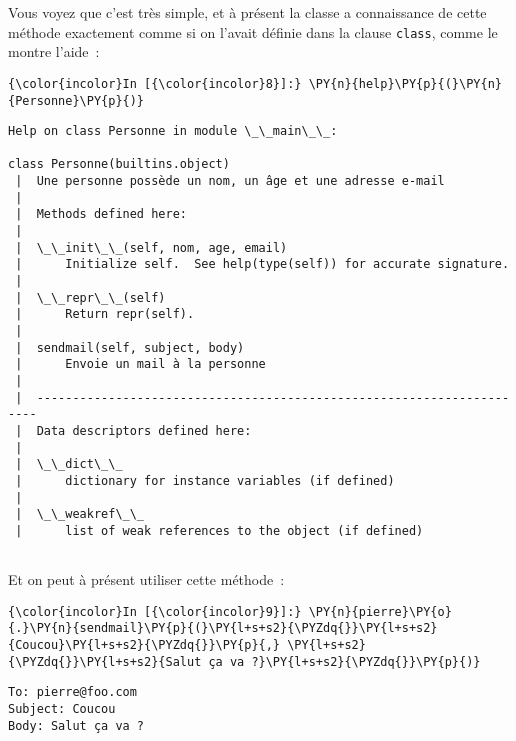 Vous voyez que c'est très simple, et à présent la classe a connaissance
de cette méthode exactement comme si on l'avait définie dans la clause
\texttt{class}, comme le montre l'aide~:

    \begin{Verbatim}[commandchars=\\\{\}]
{\color{incolor}In [{\color{incolor}8}]:} \PY{n}{help}\PY{p}{(}\PY{n}{Personne}\PY{p}{)}
\end{Verbatim}


    \begin{Verbatim}[commandchars=\\\{\}]
Help on class Personne in module \_\_main\_\_:

class Personne(builtins.object)
 |  Une personne possède un nom, un âge et une adresse e-mail
 |  
 |  Methods defined here:
 |  
 |  \_\_init\_\_(self, nom, age, email)
 |      Initialize self.  See help(type(self)) for accurate signature.
 |  
 |  \_\_repr\_\_(self)
 |      Return repr(self).
 |  
 |  sendmail(self, subject, body)
 |      Envoie un mail à la personne
 |  
 |  ----------------------------------------------------------------------
 |  Data descriptors defined here:
 |  
 |  \_\_dict\_\_
 |      dictionary for instance variables (if defined)
 |  
 |  \_\_weakref\_\_
 |      list of weak references to the object (if defined)


    \end{Verbatim}

    Et on peut à présent utiliser cette méthode~:

    \begin{Verbatim}[commandchars=\\\{\}]
{\color{incolor}In [{\color{incolor}9}]:} \PY{n}{pierre}\PY{o}{.}\PY{n}{sendmail}\PY{p}{(}\PY{l+s+s2}{\PYZdq{}}\PY{l+s+s2}{Coucou}\PY{l+s+s2}{\PYZdq{}}\PY{p}{,} \PY{l+s+s2}{\PYZdq{}}\PY{l+s+s2}{Salut ça va ?}\PY{l+s+s2}{\PYZdq{}}\PY{p}{)}
\end{Verbatim}


    \begin{Verbatim}[commandchars=\\\{\}]
To: pierre@foo.com
Subject: Coucou
Body: Salut ça va ?

    \end{Verbatim}